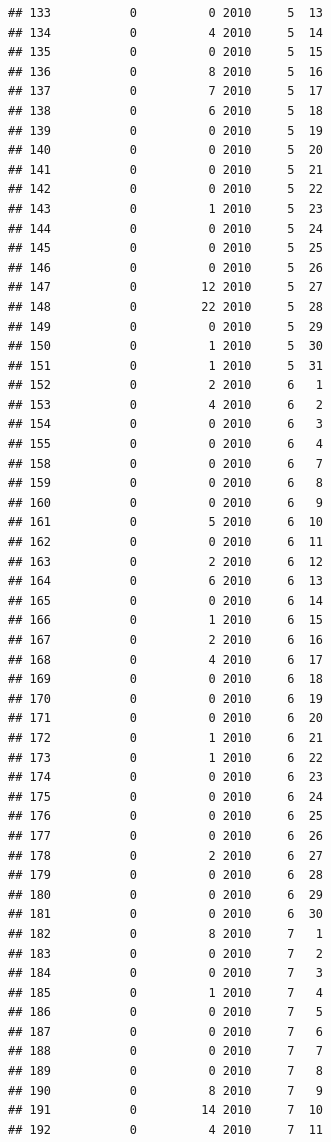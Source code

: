 \documentclass[
]{article}
\begin{document}
\begin{verbatim}
## 133           0          0 2010     5  13
## 134           0          4 2010     5  14
## 135           0          0 2010     5  15
## 136           0          8 2010     5  16
## 137           0          7 2010     5  17
## 138           0          6 2010     5  18
## 139           0          0 2010     5  19
## 140           0          0 2010     5  20
## 141           0          0 2010     5  21
## 142           0          0 2010     5  22
## 143           0          1 2010     5  23
## 144           0          0 2010     5  24
## 145           0          0 2010     5  25
## 146           0          0 2010     5  26
## 147           0         12 2010     5  27
## 148           0         22 2010     5  28
## 149           0          0 2010     5  29
## 150           0          1 2010     5  30
## 151           0          1 2010     5  31
## 152           0          2 2010     6   1
## 153           0          4 2010     6   2
## 154           0          0 2010     6   3
## 155           0          0 2010     6   4
## 158           0          0 2010     6   7
## 159           0          0 2010     6   8
## 160           0          0 2010     6   9
## 161           0          5 2010     6  10
## 162           0          0 2010     6  11
## 163           0          2 2010     6  12
## 164           0          6 2010     6  13
## 165           0          0 2010     6  14
## 166           0          1 2010     6  15
## 167           0          2 2010     6  16
## 168           0          4 2010     6  17
## 169           0          0 2010     6  18
## 170           0          0 2010     6  19
## 171           0          0 2010     6  20
## 172           0          1 2010     6  21
## 173           0          1 2010     6  22
## 174           0          0 2010     6  23
## 175           0          0 2010     6  24
## 176           0          0 2010     6  25
## 177           0          0 2010     6  26
## 178           0          2 2010     6  27
## 179           0          0 2010     6  28
## 180           0          0 2010     6  29
## 181           0          0 2010     6  30
## 182           0          8 2010     7   1
## 183           0          0 2010     7   2
## 184           0          0 2010     7   3
## 185           0          1 2010     7   4
## 186           0          0 2010     7   5
## 187           0          0 2010     7   6
## 188           0          0 2010     7   7
## 189           0          0 2010     7   8
## 190           0          8 2010     7   9
## 191           0         14 2010     7  10
## 192           0          4 2010     7  11

\end{verbatim}
\end{document}
